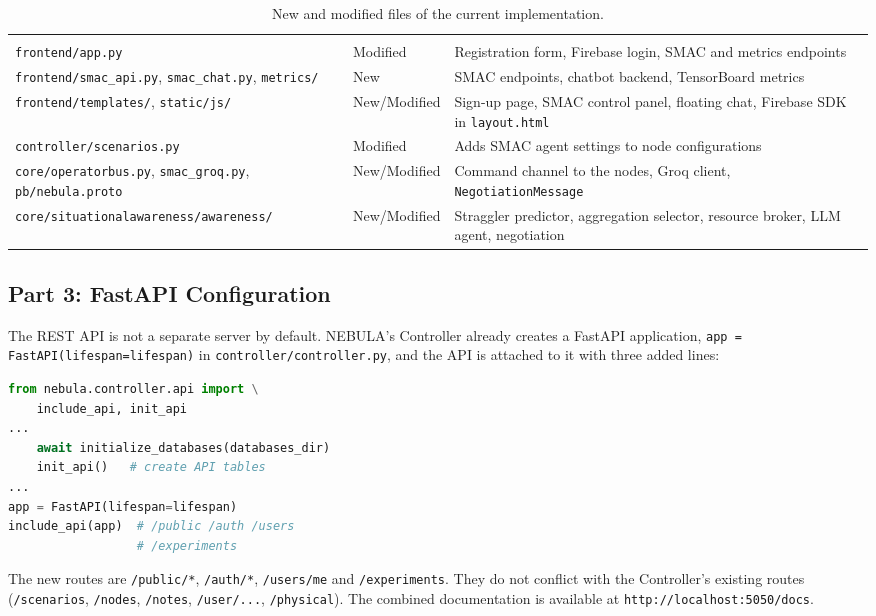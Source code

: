 \documentclass[9pt,a4paper,twocolumn]{article}
\begin{document}
\begin{table}[t]
\begin{tabularx}{\textwidth}{>{\raggedright\arraybackslash}X l >{\raggedright\arraybackslash}X}
\hline
\multicolumn{3}{l}{\textit{SMAC orchestration layer}} \\
\texttt{frontend/app.py} & Modified & Registration form, Firebase login, SMAC and metrics endpoints \\
\texttt{frontend/smac\_api.py}, \texttt{smac\_chat.py}, \texttt{metrics/} & New & SMAC endpoints, chatbot backend, TensorBoard metrics \\
\texttt{frontend/templates/}, \texttt{static/js/} & New/Modified & Sign-up page, SMAC control panel, floating chat, Firebase SDK in \texttt{layout.html} \\
\texttt{controller/scenarios.py} & Modified & Adds SMAC agent settings to node configurations \\
\texttt{core/operatorbus.py}, \texttt{smac\_groq.py}, \texttt{pb/nebula.proto} & New/Modified & Command channel to the nodes, Groq client, \texttt{NegotiationMessage} \\
\texttt{core/situationalawareness/awareness/} & New/Modified & Straggler predictor, aggregation selector, resource broker, LLM agent, negotiation \\
\hline
\end{tabularx}
\caption{New and modified files of the current implementation.}
\label{tab:file-map}
\end{table}
\subsection{Part 3: FastAPI Configuration}

The REST API is not a separate server by default. NEBULA's Controller already creates a FastAPI application, \texttt{app = FastAPI(lifespan=lifespan)} in \texttt{controller/controller.py}, and the API is attached to it with three added lines:

\begin{lstlisting}[language=Python, basicstyle=\ttfamily\footnotesize]
from nebula.controller.api import \
    include_api, init_api
...
    await initialize_databases(databases_dir)
    init_api()   # create API tables
...
app = FastAPI(lifespan=lifespan)
include_api(app)  # /public /auth /users
                  # /experiments
\end{lstlisting}

The new routes are \texttt{/public/*}, \texttt{/auth/*}, \texttt{/users/me} and \texttt{/experiments}. They do not conflict with the Controller's existing routes (\texttt{/scenarios}, \texttt{/nodes}, \texttt{/notes}, \texttt{/user/...}, \texttt{/physical}). The combined documentation is available at \texttt{http://localhost:5050/docs}.
\end{document}
